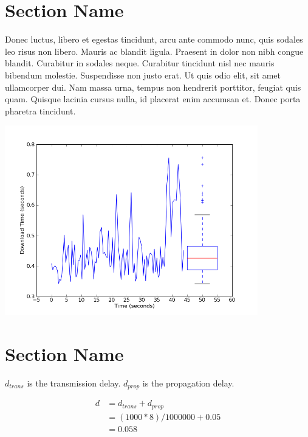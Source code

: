 \documentclass[fleqn,11pt]{article}
\begin{document}
\section{Section Name}

Donec luctus, libero et egestas tincidunt, arcu ante commodo nunc,
quis sodales leo risus non libero. Mauris ac blandit ligula. Praesent
in dolor non nibh congue blandit. Curabitur in sodales
neque. Curabitur tincidunt nisl nec mauris bibendum
molestie. Suspendisse non justo erat. Ut quis odio elit, sit amet
ullamcorper dui. Nam massa urna, tempus non hendrerit porttitor,
feugiat quis quam. Quisque lacinia cursus nulla, id placerat enim
accumsan et. Donec porta pharetra tincidunt.

\includegraphics[width=11cm]{graphs/download-combined}

\section{Section Name}

$d_{trans}$ is the transmission delay. $d_{prop}$ is the propagation delay.

\begin{align*}
d &= d_{trans} + d_{prop}\\
  &= (1000*8)/1000000 + 0.05\\
  &= 0.058
\end{align*}
\end{document}
